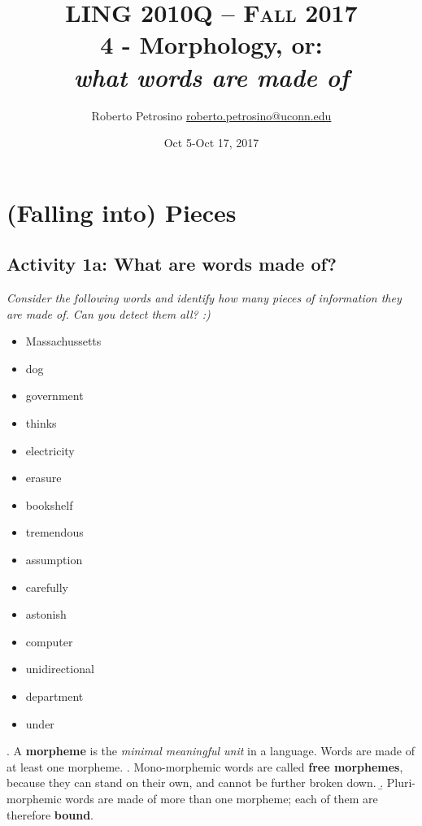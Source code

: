 \documentclass[11pt, oneside]{article}   	%
\title{{\normalsize LING 2010Q -- {\scshape Fall 2017}} \\ {\bfseries 4 - Morphology}, or: \\ {\itshape what words are made of}}
\author{Roberto Petrosino \hspace{0.2cm} \url{roberto.petrosino@uconn.edu}}
\date{Oct 5-Oct 17, 2017}
\begin{document}
\maketitle
\vspace{-1cm}
{\small \tableofcontents}

\newpage

\section{(Falling into) Pieces}

\subsection{Activity 1a: What are words made of?}\label{act:words}

{\itshape Consider the following words and identify how many pieces of information they are made of. Can you detect them all? :)}

\setlength\columnsep{0.5pt}
\begin{multicols}{5}
\centering
\scriptsize
\begin{itemize}
\item Massachussetts
\item dog
\item government

\columnbreak

\item thinks
\item electricity
\item erasure

\columnbreak

\item bookshelf
\item tremendous
\item assumption

\columnbreak

\item carefully
\item astonish
\item computer

\columnbreak

\item unidirectional
\item department
\item under

\end{itemize}
\end{multicols}

\ex. A {\bfseries morpheme} is the {\itshape minimal meaningful unit} in a language. Words are made of at least one morpheme. 
	\a. Mono-morphemic words are called {\bfseries free morphemes}, because they can stand on their own, and cannot be further broken down.
	\b. Pluri-morphemic words are made of more than one morpheme; each of them are therefore {\bfseries bound}.
\end{document}
